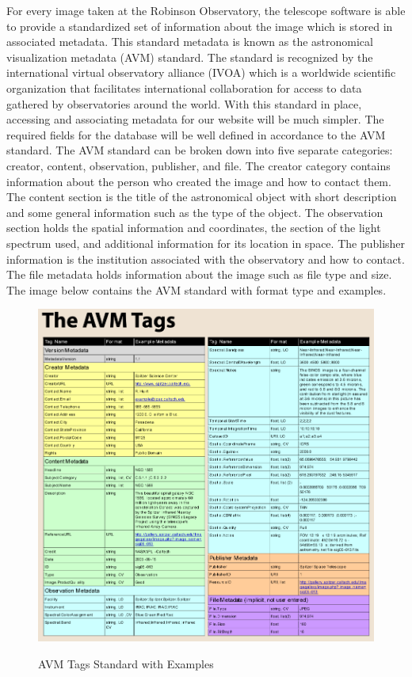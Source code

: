 \documentclass[12pt]{report}
\begin{document}
For every image taken at the Robinson Observatory, the telescope software is able to provide a standardized set of information about the image which is stored in associated metadata.  This standard metadata is known as the astronomical visualization metadata (AVM) standard.  The standard is recognized by the international virtual observatory alliance (IVOA) which is a worldwide scientific organization that facilitates international collaboration for access to data gathered by observatories around the world.  With this standard in place, accessing and associating metadata for our website will be much simpler.  The required fields for the database will be well defined in accordance to the AVM standard.
The AVM standard can be broken down into five separate categories: creator, content, observation, publisher, and file.  The creator category contains information about the person who created the image and how to contact them.  The content section is the title of the astronomical object with short description and some general information such as the type of the object.  The observation section holds the spatial information and coordinates, the section of the light spectrum used, and additional information for its location in space.  The publisher information is the institution associated with the observatory and how to contact.  The file metadata holds information about the image such as file type and size.
The image below contains the AVM standard with format type and examples.

\newpage

\begin{figure}[h]
	\centering
	\caption{AVM Tags Standard with Examples}
	\includegraphics[width=\linewidth]{avm_standards}
	\label{fig:AVM Standards}
\end{figure}
\end{document}
